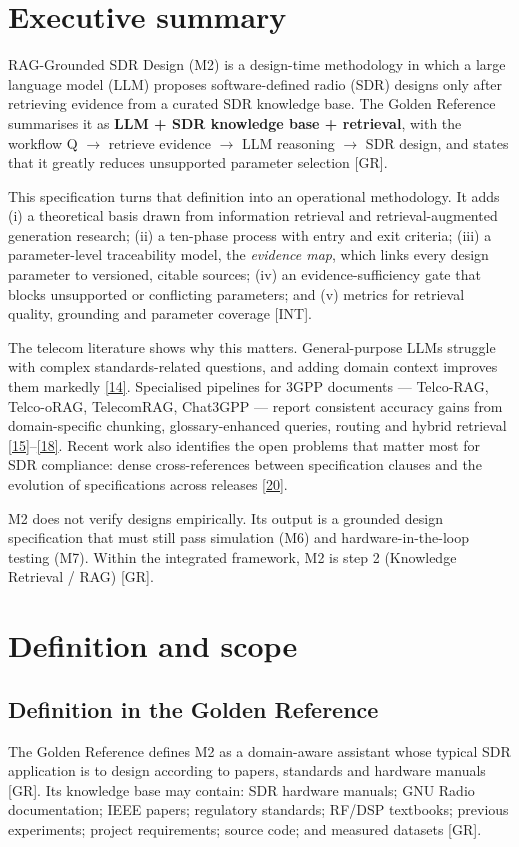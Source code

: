 \documentclass[11pt,a4paper]{article}
\newcommand{\prov}[1]{\textsf{\footnotesize[#1]}}
\begin{document}
\tableofcontents
\clearpage
\section{Executive summary}
RAG-Grounded SDR Design (M2) is a design-time methodology in which a large language model (LLM) proposes software-defined radio (SDR) designs only after retrieving evidence from a curated SDR knowledge base. The Golden Reference summarises it as \textbf{LLM + SDR knowledge base + retrieval}, with the workflow Q \ensuremath{\rightarrow} retrieve evidence \ensuremath{\rightarrow} LLM reasoning \ensuremath{\rightarrow} SDR design, and states that it greatly reduces unsupported parameter selection \prov{GR}.

This specification turns that definition into an operational methodology. It adds (i) a theoretical basis drawn from information retrieval and retrieval-augmented generation research; (ii) a ten-phase process with entry and exit criteria; (iii) a parameter-level traceability model, the \textit{evidence map}, which links every design parameter to versioned, citable sources; (iv) an evidence-sufficiency gate that blocks unsupported or conflicting parameters; and (v) metrics for retrieval quality, grounding and parameter coverage \prov{INT}.

The telecom literature shows why this matters. General-purpose LLMs struggle with complex standards-related questions, and adding domain context improves them markedly \hyperlink{ref14}{[14]}. Specialised pipelines for 3GPP documents --- Telco-RAG, Telco-oRAG, TelecomRAG, Chat3GPP --- report consistent accuracy gains from domain-specific chunking, glossary-enhanced queries, routing and hybrid retrieval \hyperlink{ref15}{[15]}--\hyperlink{ref18}{[18]}. Recent work also identifies the open problems that matter most for SDR compliance: dense cross-references between specification clauses and the evolution of specifications across releases \hyperlink{ref20}{[20]}.

M2 does not verify designs empirically. Its output is a grounded design specification that must still pass simulation (M6) and hardware-in-the-loop testing (M7). Within the integrated framework, M2 is step 2 (Knowledge Retrieval / RAG) \prov{GR}.

\section{Definition and scope}
\subsection{Definition in the Golden Reference}
The Golden Reference defines M2 as a domain-aware assistant whose typical SDR application is to design according to papers, standards and hardware manuals \prov{GR}. Its knowledge base may contain: SDR hardware manuals; GNU Radio documentation; IEEE papers; regulatory standards; RF/DSP textbooks; previous experiments; project requirements; source code; and measured datasets \prov{GR}.
\end{document}
